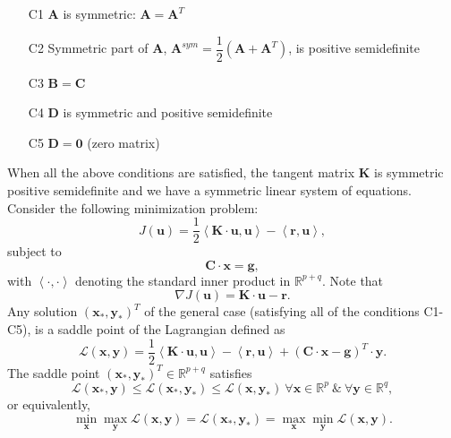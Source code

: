 \documentclass[11pt,a4paper,final]{article}
\begin{document}
\begin{itemize}
\item[C1] $\mathbf{A}$ is symmetric: $\mathbf{A} = \mathbf{A}^T$
\item[C2] Symmetric part of $\mathbf{A}$, $\mathbf{A}^{sym} = \dfrac{1}{2} \left( \mathbf{A} + \mathbf{A}^T \right)$, is positive semidefinite
\item[C3] $\mathbf{B} = \mathbf{C}$
\item[C4] $\mathbf{D}$ is symmetric and positive semidefinite
\item[C5] $\mathbf{D} = \mathbf{0}$ (zero matrix)
\end{itemize}
When all the above conditions are satisfied, the tangent matrix $\mathbf{K}$ is symmetric positive semidefinite and we have a symmetric linear system of equations. Consider the following minimization problem:
\begin{equation}
J(\mathbf{u}) = \dfrac{1}{2} \left\langle \mathbf{K} \cdot \mathbf{u}, \mathbf{u} \right\rangle - \left\langle \mathbf{r}, \mathbf{u} \right\rangle,
\label{eq:3.12}
\end{equation}
subject to 
\begin{equation}
\mathbf{C} \cdot \mathbf{x} = \mathbf{g},
\label{eq:3.13}
\end{equation}
with $\left\langle \cdot, \cdot \right\rangle$ denoting the standard inner product in $\mathbb{R}^{p+q}$.
Note that
\begin{equation}
\nabla J(\mathbf{u}) = \mathbf{K} \cdot \mathbf{u} - \mathbf{r}.
\end{equation}
Any solution $(\mathbf{x}_{\ast}, \mathbf{y}_{\ast})^T$ of the general case (satisfying all of the conditions C1-C5), is a saddle point of the Lagrangian defined as
\begin{equation}
\mathcal{L}(\mathbf{x}, \mathbf{y}) = \dfrac{1}{2} \left\langle \mathbf{K} \cdot \mathbf{u}, \mathbf{u} \right\rangle - \left\langle \mathbf{r}, \mathbf{u} \right\rangle + (\mathbf{C} \cdot \mathbf{x} - \mathbf{g})^T \cdot \mathbf{y}.
\label{eq:3.14}
\end{equation}
The saddle point $(\mathbf{x}_{\ast}, \mathbf{y}_{\ast})^T \in \mathbb{R}^{p+q}$ satisfies
\begin{equation}
\mathcal{L}(\mathbf{x}_{\ast}, \mathbf{y}) \leq \mathcal{L}(\mathbf{x}_{\ast}, \mathbf{y}_{\ast}) \leq \mathcal{L}(\mathbf{x}, \mathbf{y}_{\ast}) \ \forall \mathbf{x} \in \mathbb{R}^p \ \& \ \forall \mathbf{y} \in \mathbb{R}^q, 
\label{eq:3.15.1}
\end{equation}
or equivalently, 
\begin{equation}
\min_{\mathbf{x}} \max_{\mathbf{y}} \mathcal{L}(\mathbf{x}, \mathbf{y}) = \mathcal{L}(\mathbf{x}_{\ast}, \mathbf{y}_{\ast}) = \max_{\mathbf{x}} \min_{\mathbf{y}} \mathcal{L}(\mathbf{x}, \mathbf{y}).
\label{eq:3.15.2}
\end{equation}
\end{document}
